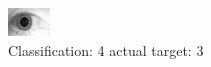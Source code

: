 \begin{figure}[h!]
\begin{center}
\includegraphics[width=0.60\columnwidth]{figures/ID1827_class_4_target_3.png}
\end{center}
\caption{ Classification: 4 actual target: 3}
\label{fig:ID1827_class_4_target_3}
\end{figure}
